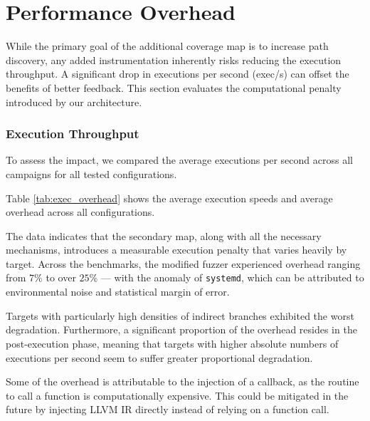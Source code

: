 \section{Performance Overhead}

While the primary goal of the additional coverage map is to increase path discovery, any added instrumentation inherently risks reducing the execution throughput. A significant drop in executions per second (exec/s) can offset the benefits of better feedback. This section evaluates the computational penalty introduced by our architecture.

\subsubsection{Execution Throughput}

To assess the impact, we compared the average executions per second across all campaigns for all tested configurations.



Table \ref{tab:exec_overhead} shows the average execution speeds and average overhead across all configurations. 

The data indicates that the secondary map, along with all the necessary mechanisms, introduces a measurable execution penalty that varies heavily by target. Across the benchmarks, the modified fuzzer experienced overhead ranging from $7\%$ to over $25\%$ --- with the anomaly of \texttt{systemd}, which can be attributed to environmental noise and statistical margin of error. 

Targets with particularly high densities of indirect branches exhibited the worst degradation. Furthermore, a significant proportion of the overhead resides in the post-execution phase, meaning that targets with higher absolute numbers of executions per second seem to suffer greater proportional degradation.

Some of the overhead is attributable to the injection of a callback, as the routine to call a function is computationally expensive. This could be mitigated in the future by injecting LLVM IR directly instead of relying on a function call.